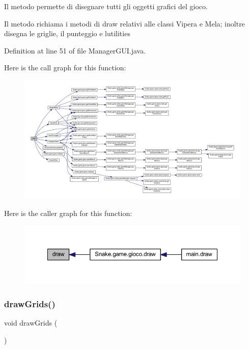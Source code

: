 Il metodo permette di disegnare tutti gli oggetti grafici del gioco. 

Il metodo richiama i metodi di draw relativi alle classi Vipera e Mela; inoltre disegna le griglie, il punteggio e l\textquotesingle{}utilities 

Definition at line 51 of file Manager\+G\+U\+I.\+java.

Here is the call graph for this function\+:
\nopagebreak
\begin{figure}[H]
\begin{center}
\leavevmode
\includegraphics[width=350pt]{class_snake_1_1gui_1_1_manager_g_u_i_a56c5cf8a568cff737ff95520cbe6b405_cgraph}
\end{center}
\end{figure}
Here is the caller graph for this function\+:
\nopagebreak
\begin{figure}[H]
\begin{center}
\leavevmode
\includegraphics[width=350pt]{class_snake_1_1gui_1_1_manager_g_u_i_a56c5cf8a568cff737ff95520cbe6b405_icgraph}
\end{center}
\end{figure}
\mbox{\label{class_snake_1_1gui_1_1_manager_g_u_i_a61024a21b8516cb0751fcecaf18c001d}} 
\subsubsection{\texorpdfstring{draw\+Grids()}{drawGrids()}}
{\footnotesize\ttfamily void draw\+Grids (\begin{DoxyParamCaption}{ }\end{DoxyParamCaption})\hspace{0.3cm}{\ttfamily [private]}}



